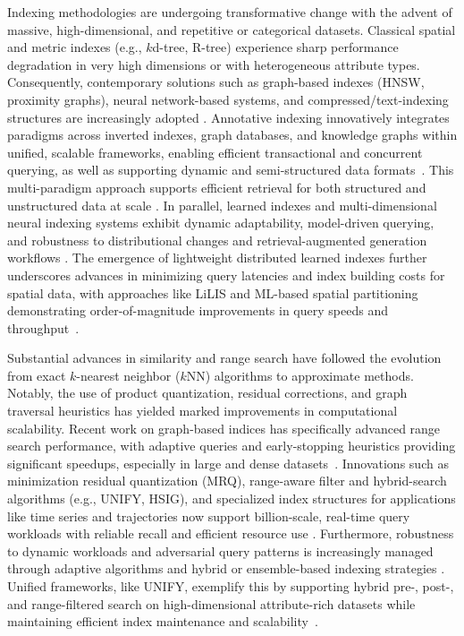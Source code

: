 \documentclass[sigconf]{acmart}
\begin{document}
Indexing methodologies are undergoing transformative change with the advent of massive, high-dimensional, and repetitive or categorical datasets. Classical spatial and metric indexes (e.g., $k$d-tree, R-tree) experience sharp performance degradation in very high dimensions or with heterogeneous attribute types. Consequently, contemporary solutions such as graph-based indexes (HNSW, proximity graphs), neural network-based systems, and compressed/text-indexing structures are increasingly adopted \cite{ref11,ref23,ref34,ref63,ref70}. Annotative indexing innovatively integrates paradigms across inverted indexes, graph databases, and knowledge graphs within unified, scalable frameworks, enabling efficient transactional and concurrent querying, as well as supporting dynamic and semi-structured data formats~\cite{ref112}. This multi-paradigm approach supports efficient retrieval for both structured and unstructured data at scale \cite{ref69}. In parallel, learned indexes and multi-dimensional neural indexing systems exhibit dynamic adaptability, model-driven querying, and robustness to distributional changes and retrieval-augmented generation workflows \cite{ref64,ref65,ref66,ref111}. The emergence of lightweight distributed learned indexes further underscores advances in minimizing query latencies and index building costs for spatial data, with approaches like LiLIS and ML-based spatial partitioning demonstrating order-of-magnitude improvements in query speeds and throughput~\cite{ref111,ref54}.

Substantial advances in similarity and range search have followed the evolution from exact $k$-nearest neighbor ($k$NN) algorithms to approximate methods. Notably, the use of product quantization, residual corrections, and graph traversal heuristics has yielded marked improvements in computational scalability. Recent work on graph-based indices has specifically advanced range search performance, with adaptive queries and early-stopping heuristics providing significant speedups, especially in large and dense datasets~\cite{ref11}. Innovations such as minimization residual quantization (MRQ), range-aware filter and hybrid-search algorithms (e.g., UNIFY, HSIG), and specialized index structures for applications like time series and trajectories now support billion-scale, real-time query workloads with reliable recall and efficient resource use \cite{ref7,ref12,ref17,ref18,ref22,ref54,ref56,ref61,ref75,ref67,ref70}. Furthermore, robustness to dynamic workloads and adversarial query patterns is increasingly managed through adaptive algorithms and hybrid or ensemble-based indexing strategies \cite{ref53,ref62,ref92}. Unified frameworks, like UNIFY, exemplify this by supporting hybrid pre-, post-, and range-filtered search on high-dimensional attribute-rich datasets while maintaining efficient index maintenance and scalability~\cite{ref12}.
\end{document}
